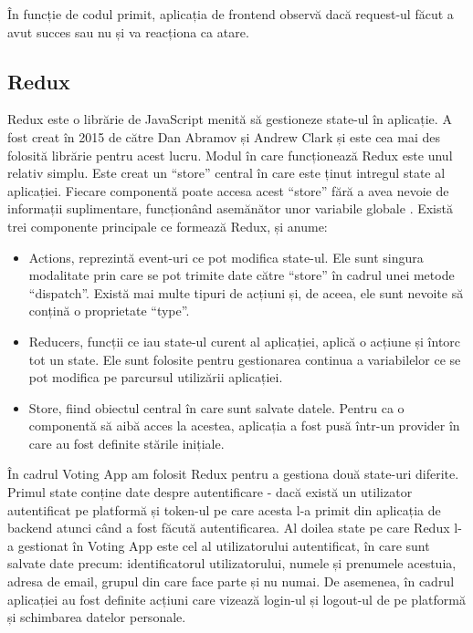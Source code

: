 În funcție de codul primit, aplicația de frontend observă dacă request-ul făcut a avut succes sau nu și va reacționa ca atare.

\subsection{Redux}

Redux este o librărie de JavaScript menită să gestioneze state-ul în aplicație. A fost creat în 2015 de către Dan Abramov și Andrew Clark și este cea mai des folosită librărie pentru acest lucru. Modul în care funcționează Redux este unul relativ simplu. Este creat un \enquote{store} central în care este ținut intregul state al aplicației. Fiecare componentă poate accesa acest \enquote{store} fără a avea nevoie de informații suplimentare, funcționând asemănător unor variabile globale \cite{redux_docs}. Există trei componente principale ce formează Redux, și anume:

\begin{itemize}
    \item Actions, reprezintă event-uri ce pot modifica state-ul. Ele sunt singura modalitate prin care se pot trimite date către \enquote{store} în cadrul unei metode \enquote{dispatch}. Există mai multe tipuri de acțiuni și, de aceea, ele sunt nevoite să conțină o proprietate \enquote{type}.
    \item Reducers, funcții ce iau state-ul curent al aplicației, aplică o acțiune și întorc tot un state. Ele sunt folosite pentru gestionarea continua a variabilelor ce se pot modifica pe parcursul utilizării aplicației.
    \item Store, fiind obiectul central în care sunt salvate datele. Pentru ca o componentă să aibă acces la acestea, aplicația a fost pusă într-un provider în care au fost definite stările inițiale.

\end{itemize}

În cadrul Voting App am folosit Redux pentru a gestiona două state-uri diferite. Primul state conține date despre autentificare - dacă există un utilizator autentificat pe platformă și token-ul pe care acesta l-a primit din aplicația de backend atunci când a fost făcută autentificarea. Al doilea state pe care Redux l-a gestionat în Voting App este cel al utilizatorului autentificat, în care sunt salvate date precum: identificatorul utilizatorului, numele și prenumele acestuia, adresa de email, grupul din care face parte și nu numai. De asemenea, în cadrul aplicației au fost definite acțiuni care vizează login-ul și logout-ul de pe platformă și schimbarea datelor personale.

